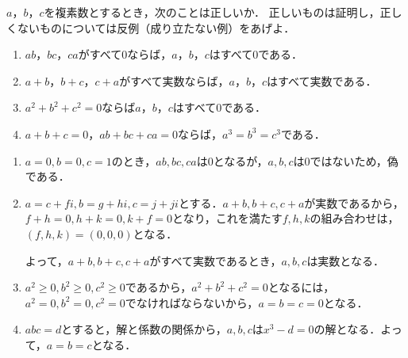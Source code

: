 \begin{problem}
$a$，$b$，$c$を複素数とするとき，次のことは正しいか．
正しいものは証明し，正しくないものについては反例（成り立たない例）をあげよ．
\begin{enumerate}
\item $ab$，$bc$，$ca$がすべて0ならば，$a$，$b$，$c$はすべて0である．
\item $a+b$，$b+c$，$c+a$がすべて実数ならば，$a$，$b$，$c$はすべて実数である．
\item $a^2+b^2+c^2=0$ならば$a$，$b$，$c$はすべて0である．
\item $a+b+c=0$，$ab+bc+ca=0$ならば，$a^3=b^3=c^3$である．
\end{enumerate}
\end{problem}

\begin{enumerate}
  \item $a=0,b=0,c=1$のとき，$ab,bc,ca$は0となるが，$a,b,c$は0ではないため，偽である．
  \item $a = c+fi, b=g+hi, c=j+ji$とする．$a+b, b+c, c+a$が実数であるから，$f+h=0,h+k=0,k+f=0$となり，これを満たす$f,h,k$の組み合わせは，$(f,h,k)=(0,0,0)$となる．

  よって，$a+b,b+c,c+a$がすべて実数であるとき，$a,b,c$は実数となる．
  \item $a^2 \geq 0, b^2 \geq 0, c^2 \geq 0$であるから，$a^2 + b^2 + c^2 = 0$となるには，$a^2 = 0, b^2 = 0, c^2 = 0$でなければならないから，$a = b = c = 0$となる．
  \item $abc = d$とすると，解と係数の関係から，$a,b,c$は$x^3-d = 0$の解となる．よって，$a=b=c$となる．
\end{enumerate}
